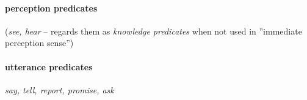 \documentclass[a4,12pt]{scrartcl}
\begin{document}
\paragraph {\bf perception predicates} ({\it see, hear} – \cite[3.2.5]{noonan2007} regards them as {\it knowledge predicates} when not used in ''immediate perception sense'')

\paragraph {\bf utterance predicates} {\it say, tell, report, promise, ask} 

\begin{exe}
\ex %

\ex %

\ex %

\ex %

\end{exe}
\end{document}
